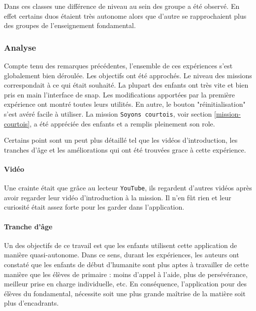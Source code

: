 Dans ces classes une différence de niveau au sein des groupe a été observé. En effet certains duos étaient très autonome alors que d'autre se rapprochaient plus des groupes de l'enseignement \gls{fondamental}.

\subsubsection{Analyse}
\label{analyse-scienceinfuse}
Compte tenu des remarques précédentes, l'ensemble de ces expériences s'est globalement bien déroulée. Les objectifs ont été approchés. Le niveau des \glspl{mission} correspondait à ce qui était souhaité. La plupart des enfants ont très vite et bien pris en main l'interface de \gls{snap}. Les modifications apportées par la première expérience ont montré toutes leurs utilités. En autre, le bouton "réinitialisation" s'est avéré facile à utiliser. La \gls{mission} \texttt{Soyons courtois}, voir section \ref{mission-courtois}, a été appréciée des enfants et a remplis pleinement son \gls{role}.

Certains point sont un peut plus détaillé tel que les vidéos d'introduction, les tranches d'âge et les améliorations qui ont été trouvées grace à cette expérience.

\paragraph{Vidéo}
Une crainte était que grâce au lecteur \texttt{YouTube}, ils regardent d'autres vidéos après avoir regarder leur vidéo d'introduction à la \gls{mission}. Il n'en fût rien et leur curiosité était assez forte pour les garder dans l'application.

\paragraph{Tranche d'âge}
\label{trancheage}
Un des objectifs de ce travail est que les enfants utilisent cette application de manière quasi-autonome. Dans ce sens, durant les expériences, les auteurs ont constaté que les enfants de début d'\gls{humanite} sont plus aptes à travailler de cette manière que les élèves de \gls{primaire} : moins d'appel à l'aide, plus de persévérance, meilleur prise en charge individuelle, etc.
En conséquence, l'application pour des élèves du \gls{fondamental}, nécessite soit une plus grande maîtrise de la matière soit plus d'encadrants.

